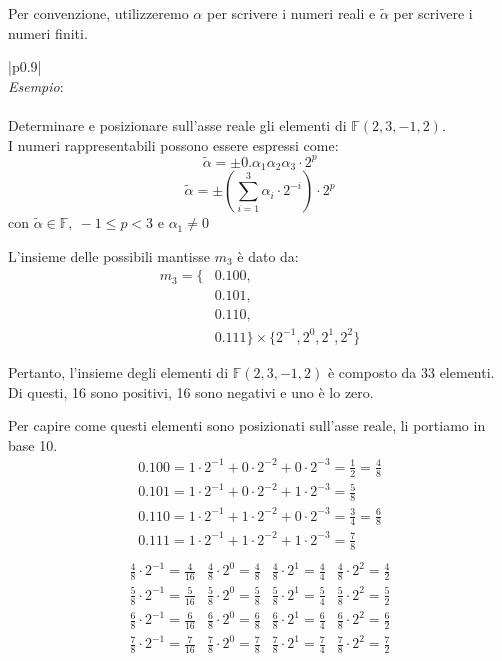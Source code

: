 \documentclass{article}
\numberwithin{equation}{section}
\newenvironment{example}
{\begin{center}
        \begin{tabular}{|p{0.9\textwidth}|}
            \hline \\ 
            \textit{Esempio}: \\\\ 
        }
        {
            \\\\ \hline
        \end{tabular}
    \end{center}
}
\begin{document}
Per convenzione, utilizzeremo $\alpha$ per scrivere i numeri reali e $\tilde{\alpha}$ per scrivere i numeri finiti.
\begin{example}
    Determinare e posizionare sull'asse reale gli elementi di $\mathbb{F}(2,3,-1,2)$. \\
    I numeri rappresentabili possono essere espressi come:
    $$\tilde\alpha=\pm0.\alpha_1\alpha_2\alpha_3\cdot 2^p$$
    $$\tilde\alpha=\pm(\sum_{i=1}^3\alpha_i\cdot 2^{-i})\cdot 2^p$$
    $\text{con }\tilde\alpha\in \mathbb{F},\ -1\leq p<3 \text{ e }\alpha_1\neq 0$

    L'insieme delle possibili mantisse $m_3$ è dato da:
    $$\begin{aligned}
    m_3 = \{ & 0.100, \\
             & 0.101, \\
             & 0.110, \\
             & 0.111 \} \times \{2^{-1}, 2^{0}, 2^{1}, 2^{2}\}
    \end{aligned}$$
    
    Pertanto, l'insieme degli elementi di $\mathbb{F}(2,3,-1,2)$ è composto da
    33 elementi. Di questi, 16 sono positivi, 16 sono negativi e uno è lo zero.

    Per capire come questi elementi sono posizionati sull'asse reale, li
    portiamo in base 10.
    {
    \renewcommand{\arraystretch}{1.5}
    \[
        \begin{array}{l}
            0.100 = 1\cdot2^{-1}+0\cdot2^{-2}+0\cdot2^{-3}=\frac{1}{2}=\frac{4}{8} \\ 
            0.101 = 1\cdot2^{-1}+0\cdot2^{-2}+1\cdot2^{-3}=\frac{5}{8} \\ 
            0.110 = 1\cdot2^{-1}+1\cdot2^{-2}+0\cdot2^{-3}=\frac{3}{4}=\frac{6}{8} \\ 
            0.111 = 1\cdot2^{-1}+1\cdot2^{-2}+1\cdot2^{-3}=\frac{7}{8} \\ 
        \end{array}
    \]
    \[
        \begin{array}{c|c|c|c}
            \frac{4}{8}\cdot2^{-1}=\frac{4}{16} & \frac{4}{8}\cdot2^{0}=\frac{4}{8} & \frac{4}{8}\cdot2^{1}=\frac{4}{4} & \frac{4}{8}\cdot2^{2}=\frac{4}{2}\\ 
            \frac{5}{8}\cdot2^{-1}=\frac{5}{16} & \frac{5}{8}\cdot2^{0}=\frac{5}{8} & \frac{5}{8}\cdot2^{1}=\frac{5}{4} & \frac{5}{8}\cdot2^{2}=\frac{5}{2}\\ 
            \frac{6}{8}\cdot2^{-1}=\frac{6}{16} & \frac{6}{8}\cdot2^{0}=\frac{6}{8} & \frac{6}{8}\cdot2^{1}=\frac{6}{4} & \frac{6}{8}\cdot2^{2}=\frac{6}{2}\\ 
            \frac{7}{8}\cdot2^{-1}=\frac{7}{16} & \frac{7}{8}\cdot2^{0}=\frac{7}{8} & \frac{7}{8}\cdot2^{1}=\frac{7}{4} & \frac{7}{8}\cdot2^{2}=\frac{7}{2}\\ 
        \end{array}
    \]
    }
    \begin{center}
\end{center}
\end{example}
\end{document}
